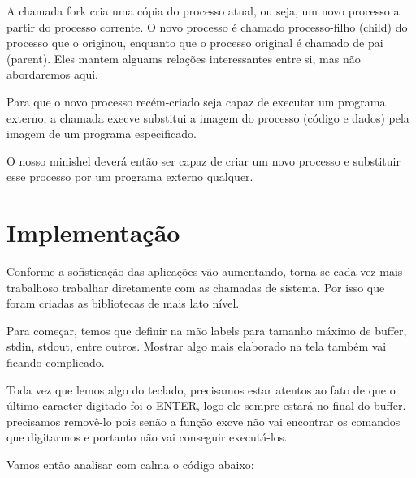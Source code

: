 A chamada fork cria uma cópia do processo atual, ou seja, um novo processo a partir do processo corrente. O novo processo é chamado processo-filho (child) do processo que o originou, enquanto que o processo original é chamado de pai (parent). Eles mantem alguams relações interessantes entre si, mas não abordaremos aqui.

Para que o novo processo recém-criado seja capaz de executar um programa externo, a chamada execve substitui a imagem do processo (código e dados) pela imagem de um programa especificado.

O nosso minishel deverá então ser capaz de criar um novo processo e substituir esse processo por um programa externo qualquer.

\section{Implementação}

Conforme a sofisticação das aplicações vão aumentando, torna-se cada vez mais trabalhoso trabalhar diretamente com as chamadas de sistema. Por isso que foram criadas as bibliotecas de mais lato nível.

Para começar, temos que definir na mão labels para tamanho máximo de buffer, stdin, stdout, entre outros. Mostrar algo mais elaborado na tela também vai ficando complicado.

Toda vez que lemos algo do teclado, precisamos estar atentos ao fato de que o último caracter digitado foi o ENTER, logo ele sempre estará no final do buffer. precisamos removê-lo pois senão a função excve não vai encontrar os comandos que digitarmos e portanto não vai conseguir executá-los.

Vamos então analisar com calma o código abaixo:

